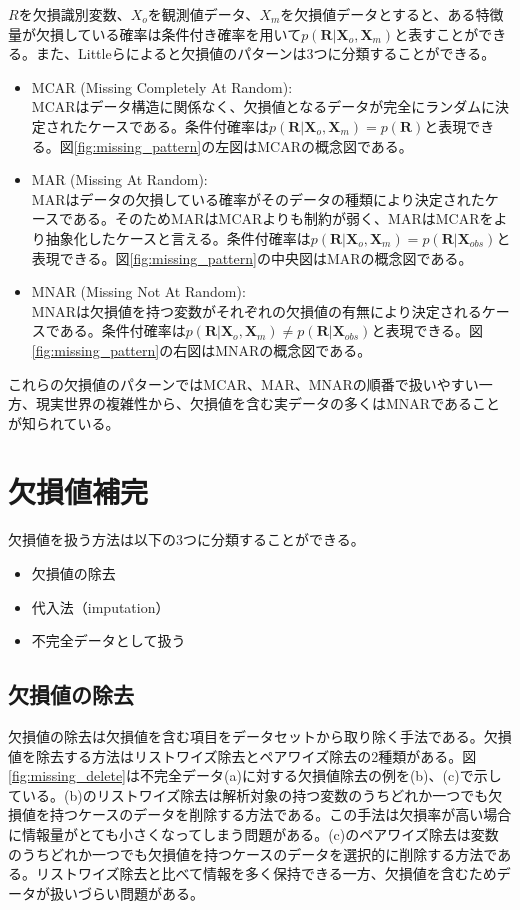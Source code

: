 $R$を欠損識別変数、$X_o$を観測値データ、$X_m$を欠損値データとすると、ある特徴量が欠損している確率は条件付き確率を用いて$p(\mathbf{R}| \mathbf{X}_{o}, \mathbf{X}_{m})$と表すことができる。また、Littleらによると欠損値のパターンは3つに分類することができる\cite{little2019statistical}。
\begin{itemize}
    \item MCAR (Missing Completely At Random):\\
    MCARはデータ構造に関係なく、欠損値となるデータが完全にランダムに決定されたケースである。条件付確率は$p(\mathbf{R}| \mathbf{X}_{o}, \mathbf{X}_{m}) = p(\mathbf{R})$と表現できる。図\ref{fig:missing_pattern}の左図はMCARの概念図である。
    \item MAR (Missing At Random):\\
    MARはデータの欠損している確率がそのデータの種類により決定されたケースである。そのためMARはMCARよりも制約が弱く、MARはMCARをより抽象化したケースと言える。条件付確率は$p(\mathbf{R}| \mathbf{X}_{o}, \mathbf{X}_{m}) = p(\mathbf{R}| \mathbf{X}_{obs})$と表現できる。図\ref{fig:missing_pattern}の中央図はMARの概念図である。
    \item MNAR (Missing Not At Random):\\
    MNARは欠損値を持つ変数がそれぞれの欠損値の有無により決定されるケースである。条件付確率は$p(\mathbf{R}| \mathbf{X}_{o}, \mathbf{X}_{m}) \neq p(\mathbf{R}| \mathbf{X}_{obs})$と表現できる。図\ref{fig:missing_pattern}の右図はMNARの概念図である。
\end{itemize}

これらの欠損値のパターンではMCAR、MAR、MNARの順番で扱いやすい一方、現実世界の複雑性から、欠損値を含む実データの多くはMNARであることが知られている。

\section{欠損値補完}
欠損値を扱う方法は以下の3つに分類することができる。
\begin{itemize}
\item 欠損値の除去 
\item 代入法（imputation）
\item 不完全データとして扱う
\end{itemize}
\subsection{欠損値の除去}
欠損値の除去は欠損値を含む項目をデータセットから取り除く手法である。欠損値を除去する方法はリストワイズ除去とペアワイズ除去の2種類がある。図\ref{fig:missing_delete}は不完全データ(a)に対する欠損値除去の例を(b)、(c)で示している。(b)のリストワイズ除去\cite{GarciaLaencina2010}は解析対象の持つ変数のうちどれか一つでも欠損値を持つケースのデータを削除する方法である。この手法は欠損率が高い場合に情報量がとても小さくなってしまう問題がある。(c)のペアワイズ除去は変数のうちどれか一つでも欠損値を持つケースのデータを選択的に削除する方法である。リストワイズ除去と比べて情報を多く保持できる一方、欠損値を含むためデータが扱いづらい問題がある。

